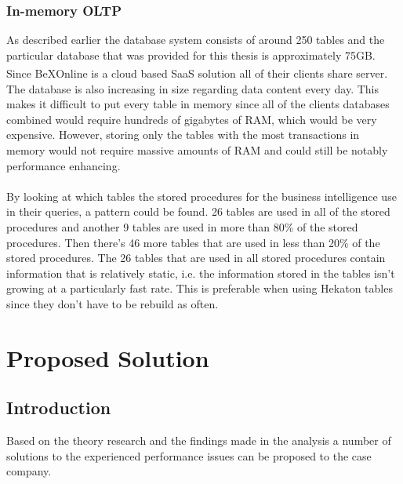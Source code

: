 \documentclass{cslthse-msc}
\newcommand{\bex}{BeX\textsuperscript{\textregistered}}
\begin{document}
\subsection{In-memory OLTP}
As described earlier the database system consists of around 250 tables and the particular database that was provided for this thesis is approximately 75GB. Since \bex Online is a cloud based SaaS solution all of their clients share server. The database is also increasing in size regarding data content every day. This makes it difficult to put every table in memory since all of the clients databases combined would require hundreds of gigabytes of RAM, which would be very expensive. However, storing only the tables with the most transactions in memory would not require massive amounts of RAM and could still be notably performance enhancing.
\\\\
By looking at which tables the stored procedures for the business intelligence use in their queries, a pattern could be found. 26 tables are used in all of the stored procedures and another 9 tables are used in more than 80\% of the stored procedures. Then there's 46 more tables that are used in less than 20\% of the stored procedures. The 26 tables that are used in all stored procedures contain information that is relatively static, i.e. the information stored in the tables isn't growing at a particularly fast rate. This is preferable when using Hekaton tables since they don't have to be rebuild as often.

\chapter{Proposed Solution}\label{sec:proposedsoluton}
\section{Introduction}
Based on the theory research and the findings made in the analysis a number of solutions to the experienced performance issues can be proposed to the case company.
\end{document}
